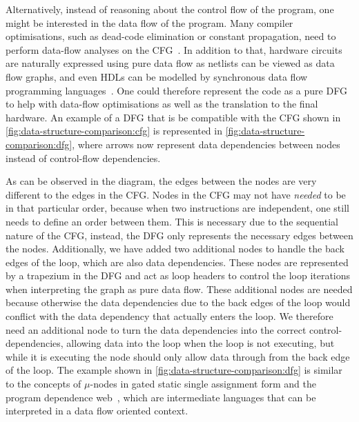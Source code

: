 Alternatively, instead of reasoning about the control flow of the program, one
might be interested in the \gls{data flow} of the program.  Many compiler
optimisations, such as dead-code elimination or constant propagation, need to
perform data-flow analyses on the
\gls{CFG}~\cite[]{kildall73_unified_approac_global_progr_optim,kam76_gdfaia}.
In addition to that, hardware circuits are naturally expressed using pure data
flow as netlists can be viewed as data flow graphs, and even \glspl{HDL} can be
modelled by synchronous data flow programming
languages~\cite{halbwachs91_sdfpll}.  One could therefore represent the code as
a pure \gls{DFG} to help with data-flow optimisations as well as the translation
to the final hardware.  An example of a \gls{DFG} that is be compatible with
the \gls{CFG} shown in \cref{fig:data-structure-comparison:cfg} is represented
in \cref{fig:data-structure-comparison:dfg}, where arrows now represent data
dependencies between nodes instead of control-flow dependencies.

As can be observed in the diagram, the edges between the nodes are very
different to the edges in the \gls{CFG}.  Nodes in the \gls{CFG} may not have
\emph{needed} to be in that particular order, because when two instructions are
independent, one still needs to define an order between them.  This is necessary
due to the sequential nature of the \gls{CFG}, instead, the \gls{DFG} only
represents the necessary edges between the nodes.  Additionally, we have added
two additional nodes to handle the back edges of the loop, which are also data
dependencies.  These nodes are represented by a trapezium in the \gls{DFG} and act
as loop headers to control the loop iterations when interpreting the graph as
pure data flow.  These additional nodes are needed because otherwise the data
dependencies due to the back edges of the loop would conflict with the data
dependency that actually enters the loop.  We therefore need an additional node
to turn the data dependencies into the correct control-dependencies, allowing
data into the loop when the loop is not executing, but while it is executing the
node should only allow data through from the back edge of the loop.  The example
shown in \cref{fig:data-structure-comparison:dfg} is similar to the concepts of
$\mu$-nodes in gated static single assignment form and the program dependence
web~\cite{ottenstein90_progr_depen_web, campbell93_refin,havlak94_const,
  tu95_effic_build_placin_gatin_funct}, which are intermediate languages that
can be interpreted in a data flow oriented context.

